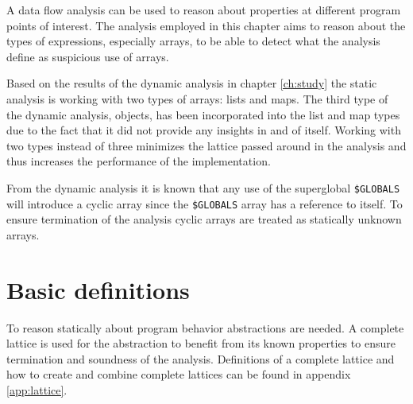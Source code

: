 A data flow analysis can be used to reason about properties at different program points of interest. The analysis employed in this chapter aims to reason about the types of expressions, especially arrays, to be able to detect what the analysis define as suspicious use of arrays.

Based on the results of the dynamic analysis in chapter \ref{ch:study} the static analysis is working with two types of arrays: lists and maps. The third type of the dynamic analysis, objects, has been incorporated into the list and map types due to the fact that it did not provide any insights in and of itself. Working with two types instead of three minimizes the lattice passed around in the analysis and thus increases the performance of the implementation.

From the dynamic analysis it is known that any use of the superglobal \texttt{\$GLOBALS} will introduce a cyclic array since the \texttt{\$GLOBALS} array has a reference to itself. To ensure termination of the analysis cyclic arrays are treated as statically unknown arrays. 


\section{Basic definitions}
To reason statically about program behavior abstractions are needed. A complete lattice is used for the abstraction to benefit from its known properties to ensure termination and soundness of the analysis. Definitions of a complete lattice and how to create and combine complete lattices can be found in appendix \ref{app:lattice}.